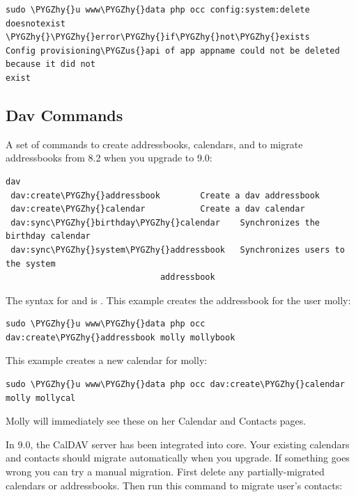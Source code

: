 \documentclass[letterpaper,10pt,english]{sphinxmanual}
\def\PYGZus{\char`\_}
\def\PYGZhy{\char`\-}
\begin{document}
\begin{Verbatim}[commandchars=\\\{\}]
sudo \PYGZhy{}u www\PYGZhy{}data php occ config:system:delete doesnotexist
\PYGZhy{}\PYGZhy{}error\PYGZhy{}if\PYGZhy{}not\PYGZhy{}exists
Config provisioning\PYGZus{}api of app appname could not be deleted because it did not
exist
\end{Verbatim}


\subsection{Dav Commands}
\label{configuration_server/occ_command:dav-label}\label{configuration_server/occ_command:dav-commands}
A set of commands to create addressbooks, calendars, and to
migrate addressbooks from 8.2 when you upgrade to 9.0:

\begin{Verbatim}[commandchars=\\\{\}]
dav
 dav:create\PYGZhy{}addressbook        Create a dav addressbook
 dav:create\PYGZhy{}calendar           Create a dav calendar
 dav:sync\PYGZhy{}birthday\PYGZhy{}calendar    Synchronizes the birthday calendar
 dav:sync\PYGZhy{}system\PYGZhy{}addressbook   Synchronizes users to the system
                               addressbook
\end{Verbatim}

The syntax for  and   is
. This example creates the addressbook
 for the user molly:

\begin{Verbatim}[commandchars=\\\{\}]
sudo \PYGZhy{}u www\PYGZhy{}data php occ dav:create\PYGZhy{}addressbook molly mollybook
\end{Verbatim}

This example creates a new calendar for molly:

\begin{Verbatim}[commandchars=\\\{\}]
sudo \PYGZhy{}u www\PYGZhy{}data php occ dav:create\PYGZhy{}calendar molly mollycal
\end{Verbatim}

Molly will immediately see these on her Calendar and Contacts pages.

In 9.0, the CalDAV server has been integrated into core. Your existing
calendars and contacts should migrate automatically when you upgrade. If
something goes wrong you can try a manual migration. First delete any
partially-migrated calendars or addressbooks. Then run this
command to migrate user's contacts:
\end{document}

